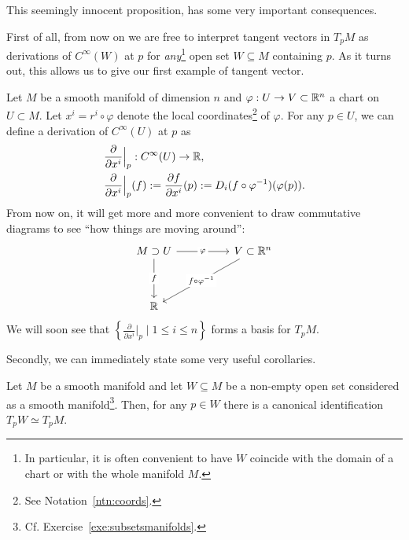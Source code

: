 This seemingly innocent proposition, has some very important consequences.

First of all, from now on we are free to interpret tangent vectors in $T_p M$ as derivations of $C^\infty(W)$ at $p$ for \emph{any}\footnote{In particular, it is often convenient to have $W$ coincide with the domain of a chart or with the whole manifold $M$.} open set $W\subseteq M$ containing $p$.
As it turns out, this allows us to give our first example of tangent vector.

\begin{example}\label{ex:partialderivative}
  Let $M$ be a smooth manifold of dimension $n$ and $\varphi: U \to V\subset\mathbb{R}^n$ a chart on $U\subset M$.
  Let $x^i = r^i \circ \varphi$ denote the local coordinates\footnote{See Notation~\ref{ntn:coords}.} of $\varphi$.
  For any $p\in U$, we can define a derivation of $C^\infty(U)$ at $p$ as
  \begin{align}
     & \frac{\partial}{\partial x^i}\Big|_p : C^\infty(U) \to \mathbb{R},                                                             \\
     & \frac{\partial}{\partial x^i}\Big|_p (f) := \frac{\partial f}{\partial x^i}(p) := D_i(f\circ\varphi^{-1})(\varphi(p)).
  \end{align}
  From now on, it will get more and more convenient to draw commutative diagrams to see ``how things are moving around'':
  \begin{equation}
    \begin{tikzcd}[column sep = huge, row sep = huge]
      M\supset U \arrow[r, "\varphi" description] \arrow[d, "f" description] & V \subset\R^n \arrow [dl, "f\circ\varphi^{-1}" description]\\
      \R &
    \end{tikzcd}
  \end{equation}
  We will soon see that $\left\{\frac{\partial}{\partial x^i}\Big|_p \mid 1\leq i\leq n\right\}$ forms a basis for $T_p M$.
\end{example}

Secondly, we can immediately state some very useful corollaries.

\begin{corollary}\label{cor:tgsubspace}
  Let $M$ be a smooth manifold and let $W\subseteq M$ be a non-empty open set considered as a smooth manifold\footnote{Cf. Exercise~\ref{exe:subsetsmanifolds}.}.
  Then, for any $p\in W$ there is a canonical identification $T_p W \simeq T_p M$.
\end{corollary}

